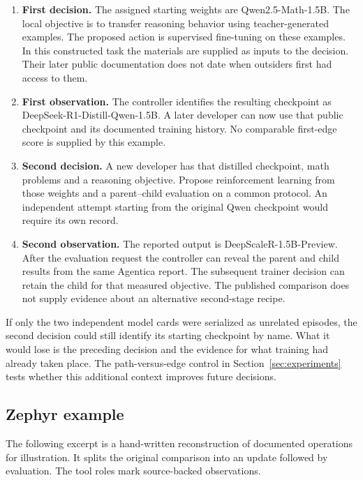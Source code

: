 \begin{enumerate}
\item \textbf{First decision.} The assigned starting weights are Qwen2.5-Math-1.5B. The local objective is to transfer reasoning behavior using teacher-generated examples. The proposed action is supervised fine-tuning on these examples. In this constructed task the materials are supplied as inputs to the decision. Their later public documentation does not date when outsiders first had access to them.
\item \textbf{First observation.} The controller identifies the resulting checkpoint as DeepSeek-R1-Distill-Qwen-1.5B. A later developer can now use that public checkpoint and its documented training history. No comparable first-edge score is supplied by this example.
\item \textbf{Second decision.} A new developer has that distilled checkpoint, math problems and a reasoning objective. Propose reinforcement learning from those weights and a parent--child evaluation on a common protocol. An independent attempt starting from the original Qwen checkpoint would require its own record.
\item \textbf{Second observation.} The reported output is DeepScaleR-1.5B-Preview. After the evaluation request the controller can reveal the parent and child results from the same Agentica report. The subsequent trainer decision can retain the child for that measured objective. The published comparison does not supply evidence about an alternative second-stage recipe.
\end{enumerate}

If only the two independent model cards were serialized as unrelated episodes, the second decision could still identify its starting checkpoint by name. What it would lose is the preceding decision and the evidence for what training had already taken place. The path-versus-edge control in Section~\ref{sec:experiments} tests whether this additional context improves future decisions.

\subsection{Zephyr example}

The following excerpt is a hand-written reconstruction of documented operations for illustration. It splits the original comparison into an update followed by evaluation. The tool roles mark source-backed observations.

